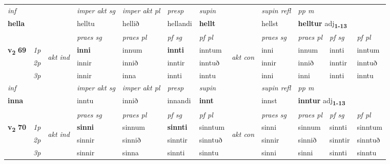 \begin{longtable}[l]{X>{\footnotesize\itshape}llXXXXlXXXX}
\cmidrule{4-7}
   {\textit{inf}} & &  & \textit{imper akt sg} & \textit{imper akt pl}   & \textit{presp} & \textit{supin} && \textit{supin refl} & \textit{pp m} \\*
  {\textbf{hella}} & && helltu  & hellið   & hellandi &  \textbf{hellt} && hellst & \multicolumn{2}{l}{\textbf{helltur} adj\textbf{\textsubscript{1-13}}} \\*

\midrule

 & &   & \textit{praes sg}  & \textit{praes pl}    & \textit{ pf sg} & \textit{pf pl} & & \textit{praes sg}  & \textit{praes pl}    & \textit{pf sg} & \textit{pf pl }  \\ \cmidrule{4-7} \cmidrule{9-12}
 \multirow{2}{*}{{{\textbf{v{\textsubscript{2}}} \Large{\textbf{69}}}}}  & 1p & \multirow{3}{*}{\begin{turn}{90}\textit{akt ind}\end{turn}} & \textbf{inni} & innum & \textbf{innti} & inntum & \multirow{3}{*}{\begin{turn}{90}\textit{akt con}\end{turn}} &inni & innum & innti & inntum\\*
 & 2p &  &  innir  & innið & inntir & inntuð & & innir & innið & inntir & inntuð \\*
 & 3p &  & innir & inna & innti & inntu & & inni & inni& innti & inntu \\*
\cmidrule{4-7} \cmidrule{9-12}

   {\textit{inf}} & &  & \textit{imper akt sg} & \textit{imper akt pl}   & \textit{presp} & \textit{supin} && \textit{supin refl} & \textit{pp m} \\*
  {\textbf{inna}} & && inntu  & innið   & innandi &  \textbf{innt} && innst & \multicolumn{2}{l}{\textbf{inntur} adj\textbf{\textsubscript{1-13}}} \\*

\midrule

 & &   & \textit{praes sg}  & \textit{praes pl}    & \textit{ pf sg} & \textit{pf pl} & & \textit{praes sg}  & \textit{praes pl}    & \textit{pf sg} & \textit{pf pl }  \\ \cmidrule{4-7} \cmidrule{9-12}
 \multirow{2}{*}{{{\textbf{v{\textsubscript{2}}} \Large{\textbf{70}}}}}  & 1p & \multirow{3}{*}{\begin{turn}{90}\textit{akt ind}\end{turn}} & \textbf{sinni} & sinnum & \textbf{sinnti} & sinntum & \multirow{3}{*}{\begin{turn}{90}\textit{akt con}\end{turn}} &sinni & sinnum & sinnti & sinntum\\*
 & 2p &  &  sinnir  & sinnið & sinntir & sinntuð & & sinnir & sinnið & sinntir & sinntuð \\*
 & 3p &  & sinnir & sinna & sinnti & sinntu & & sinni & sinni& sinnti & sinntu \\*
\cmidrule{4-7} \cmidrule{9-12}


\end{longtable}
